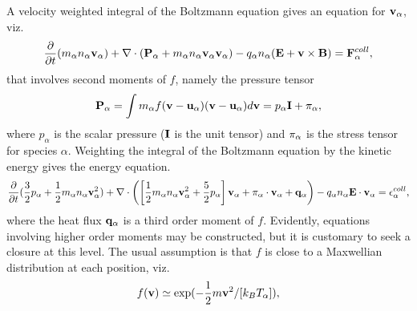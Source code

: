 A velocity weighted integral of the Boltzmann equation 
gives an equation for ${\bf v}_\alpha $, viz.
\label{eq:e2.7}
\begin{equation}
\frac{\partial} {\partial t} (m_\alpha n_\alpha {\bf v}_\alpha ) +
\nabla  \cdot ( {\bf P}_\alpha  +m_\alpha  n_\alpha  {\bf v}_\alpha {\bf v}_\alpha  )
- q_\alpha  n_\alpha  ({\bf E} + {\bf v} \times {\bf B}) = 
{\bf F}_\alpha ^{coll},
\end{equation}
that involves second moments of $f$, namely the pressure tensor
\label{eq:e2.8}
\begin{equation}
{\bf P}_\alpha  =
\int m_\alpha  f
({\bf v} - {\bf u_\alpha })
({\bf v} - {\bf u_\alpha })
d{\bf v}
= p_\alpha  {\bf I} + {\bf \pi}_\alpha ,
\end{equation}
where $p_\alpha $ is the scalar pressure (${\bf I}$ is the unit tensor) and 
${\bf \pi}_\alpha $ is the stress tensor for species $\alpha$.  Weighting the 
integral of the Boltzmann equation by the kinetic energy gives the energy equation.
\label{eq:e2.9}
\begin{equation}
\frac{\partial}{\partial t} (\frac{3}{2}p_\alpha +\frac{1}{2} m_\alpha n_\alpha {\bf v}_\alpha ^2) + \nabla \cdot
\left(\left[
\frac {1}{2} m_\alpha n_\alpha {\bf v}_\alpha ^2 + \frac{5}{2} p_\alpha \right]
{\bf v}_\alpha  + {\bf \pi}_\alpha  \cdot {\bf v}_\alpha  + {\bf q}_\alpha \right)
- q_\alpha  n_\alpha  {\bf E} \cdot {\bf v}_\alpha  = \epsilon_\alpha ^{coll},
\end{equation}
where the heat flux ${\bf q}_\alpha $ is a third order moment of $f$.  Evidently, 
equations involving higher order moments may be constructed, but it is 
customary to seek a closure at this level.  The usual assumption is 
that $f$ is close to a Maxwellian distribution at each position, viz.
\label{eq:e2.10}
\begin{equation}
f({\bf v}) \simeq \exp (-
\frac{1}{2} m{\bf v}^2/[k_BT_\alpha]),
\end{equation}
